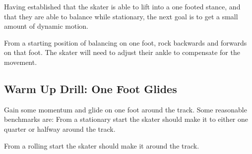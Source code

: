 Having established that the skater is able to lift into a one footed stance, and that they are able to balance while stationary, the next goal is to get a small amount of dynamic motion. 

From a starting position of balancing on one foot, rock backwards and forwards on that foot. 
The skater will need to adjust their ankle to compensate for the movement.


\subsection*{Warm Up Drill: One Foot Glides} 

Gain some momentum and glide on one foot around the track. 
Some reasonable benchmarks are: From a stationary start the skater should make it to either one quarter or halfway around the track. 

From a rolling start the skater should make it around the track.
